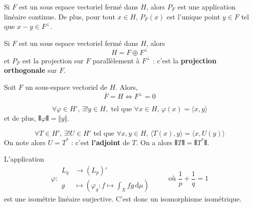 	\begin{theorem}
		Si $F$ est un sous espace vectoriel fermé dans $H$, alors $P_F$ est une application linéaire continue. De plus, pour tout $x \in H$, $P_F(x)$ est l'unique point $y \in F$ tel que $x-y \in F^\perp$.
	\end{theorem}
	
	\begin{theorem}
		Si $F$ est un sous espace vectoriel fermé dans $H$, alors
		\[ H = F \oplus F^\perp \]
		et $P_F$ est la projection sur $F$ parallèlement à $F^\perp$ : c'est la \textbf{projection orthogonale} sur $F$.
	\end{theorem}
	
	\begin{corollary}
		Soit $F$ un sous-espace vectoriel de $H$. Alors,
		\[ \overline{F} = H \iff F^\perp = 0 \]
	\end{corollary}
	
	\begin{theorem}
		\[ \forall \varphi \in H', \, \exists! y \in H, \text{ tel que } \forall x \in H, \, \varphi(x) = \langle x, y \rangle \]
		et de plus, $\VERT \varphi \VERT = \Vert y \Vert$.
	\end{theorem}
	
	\begin{corollary}
		\[ \forall T \in H', \, \exists! U \in H' \text{ tel que } \forall x, y \in H, \, \langle T(x), y \rangle = \langle x, U(y) \rangle \]
		On note alors $U = T^*$ : c'est \textbf{l'adjoint} de $T$. On a alors $\VERT T \VERT = \VERT T^* \VERT$.
	\end{corollary}
	
	
	\begin{application}
		L'application
		\[
		\varphi :
		\begin{array}{ll}
			L_q &\rightarrow (L_p)' \\
			g &\mapsto \left( \varphi_g : f \mapsto \int_X f g \, \mathrm{d}\mu \right)
		\end{array}
		\qquad \text{ où } \frac{1}{p} + \frac{1}{q} = 1
		\]
		est une isométrie linéaire surjective. C'est donc un isomorphisme isométrique.
	\end{application}


